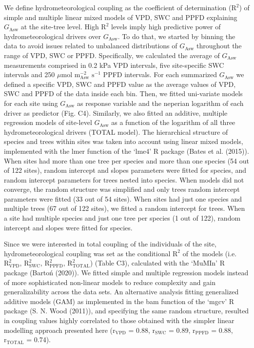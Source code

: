 \documentclass[11pt,twoside]{reedthesis}
\begin{document}
We define hydrometeorological coupling as the coefficient of
determination (\(\text{R}^2\)) of simple and multiple linear mixed
models of VPD, SWC and PPFD explaining \(G_{\text{Asw}}\) at the
site-tree level. High \(\text{R}^2\) levels imply high predictive power
of hydrometeorological drivers over \(G_{\text{Asw}}\). To do that, we
started by binning the data to avoid issues related to unbalanced
distributions of \(G_{\text{Asw}}\) throughout the range of VPD, SWC or
PPFD. Specifically, we calculated the average of \(G_{\text{Asw}}\)
measurements comprised in 0.2 kPa VPD intervals, five site-specific SWC
intervals and 250 \(\mu\)mol \(\text{m}^{-2}_{\text{Asw}}\)
\(\text{s}^{-1}\) PPFD intervals. For each summarized \(G_{\text{Asw}}\)
we defined a specific VPD, SWC and PPFD value as the average values of
VPD, SWC and PPFD of the data inside each bin. Then, we fitted
uni-variate models for each site using \(G_{\text{Asw}}\) as response
variable and the neperian logarithm of each driver as predictor (Fig.
C4). Similarly, we also fitted an additive, multiple regression models
of site-level \(G_{\text{Asw}}\) as a function of the logarithm of all
three hydrometeorological drivers (TOTAL model). The hierarchical
structure of species and trees within sites was taken into account using
linear mixed models, implemented with the lmer function of the `lme4' R
package (Bates et al. (2015)). When sites had more than one tree per
species and more than one species (54 out of 122 sites), random
intercept and slopes parameters were fitted for species, and random
intercept parameters for trees nested into species. When models did not
converge, the random structure was simplified and only trees random
intercept parameters were fitted (33 out of 54 sites). When sites had
just one species and multiple trees (67 out of 122 sites), we fitted a
random intercept for trees. When a site had multiple species and just
one tree per species (1 out of 122), random intercept and slopes were
fitted for species.\par

Since we were interested in total coupling of the individuals of the
site, hydrometeorological coupling was set as the conditional
\(\text{R}^2\) of the models (i.e. \(\text{R}^2_{\text{VPD}}\),
\(\text{R}^2_{\text{SWC}}\), \(\text{R}^2_{\text{PPFD}}\),
\(\text{R}^2_{\text{TOTAL}}\)) (Table C3), calculated with the `MuMIn' R
package (Bartoń (2020)). We fitted simple and multiple regression models
instead of more sophisticated non-linear models to reduce complexity and
gain generalizability across the data sets. An alternative analysis
fitting generalized additive models (GAM) as implemented in the bam
function of the `mgcv' R package (S. N. Wood (2011)), and specifying the
same random structure, resulted in coupling values highly correlated to
those obtained with the simpler linear modelling approach presented here
(\(\text{r}_{\text{VPD}}\) = 0.88, \(\text{r}_{\text{SWC}}\) = 0.89,
\(\text{r}_{\text{PPFD}}\) = 0.88, \(\text{r}_{\text{TOTAL}}\) =
0.74).\par
\end{document}
